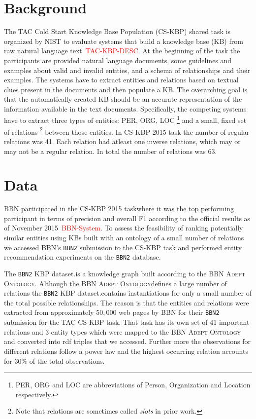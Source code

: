 \documentclass[paper=a4,fontsize=11pt]{scrartcl}
\numberwithin{equation}{section}    %
\numberwithin{figure}{section}      %
\numberwithin{table}{section}       %
\renewcommand{\cite}[1]{\textcolor{red}{#1}}
\newcommand{\dataset}[0]{\texttt{BBN2} KBP dataset.}
\newcommand{\ontology}{\textsc{BBN Adept Ontology}}
\newcommand{\task}{CS-KBP 2015 task}
\begin{document}
\section{Background}
\label{sec:background}
The TAC Cold Start Knowledge Base Population (CS-KBP) shared task is organized
by NIST to evaluate systems that build a knowledge base (KB) from raw natural
language text~\cite{TAC-KBP-DESC}.  At the beginning of the task the
participants are provided natural language documents,
some guidelines and examples about valid and invalid entities,
and a schema of relationships and their examples.
The systems have to extract entities and relations
based on textual clues present in the documents and
then populate a KB. The overarching goal is that the automatically
created KB should be
an accurate representation of the information available in the text
documents. Specifically, the
competing systems have to extract three types of entities: \textsc{PER, ORG, LOC}
\footnote{PER, ORG and LOC are abbreviations of Person, Organization
  and Location respectively.}  and a small, fixed set of relations
\footnote{Note that relations are sometimes called \textit{slots} in prior work.}
between those entities. {In \task
  the number of regular relations was 41. Each relation
had atleast one inverse relations, which may or may not be a regular relation.
In total the number of relations was 63.}

\section{Data}
\label{sec:data}
BBN participated in the \task where it was the top performing
participant in terms of precision and overall F1 according to the official
results as of November 2015~\cite{BBN-System}. To assess the feasibility of
ranking potentially similar entities using KBs built with an ontology of a small
number of relations we accessed BBN's \texttt{BBN2} submission to the CS-KBP
task and performed entity recommendation experiments on the \texttt{BBN2}
database.

The \dataset is a knowledge graph built according to the \ontology.
Although the \ontology defines a large number of
relations the \dataset contains instantiations for only a small
number of the total possible relationships.
The reason is that the entities and relations
were extracted from approximately $50,000$ web pages by BBN for their
\texttt{BBN2} submission for the TAC CS-KBP task. That task has its own set
of 41 important relations and 3 entity types which were mapped to the \ontology
and converted into rdf triples that we accessed.
Further more the observations for different relations follow a power law
and the highest occurring relation accounts for $30\%$ of the total
observations.
\end{document}
